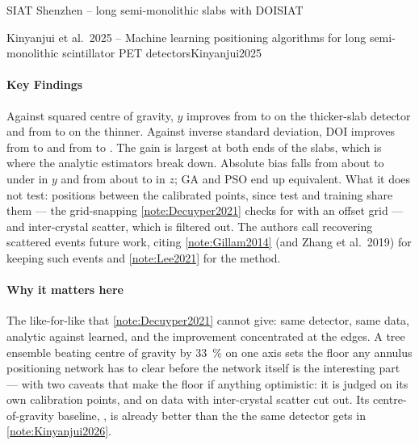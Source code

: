 \begin{programnote}{SIAT Shenzhen -- long semi-monolithic slabs with DOI}{SIAT}
\begin{papernote}{Kinyanjui et al.\ 2025 -- Machine learning positioning algorithms for long semi-monolithic scintillator PET detectors}{Kinyanjui2025}
\paragraph{Key Findings}
Against squared centre of gravity, $y$ improves from  to
 on the thicker-slab detector and from  to
 on the thinner. Against inverse standard deviation, DOI
improves from  to  and from
 to . The gain is largest at both ends of
the slabs, which is where the analytic estimators break down.
Absolute bias falls from about  to under  in $y$ and from
about  to  in $z$; GA and PSO end up equivalent.
What it does not test: positions between the calibrated points, since test
and training share them --- the grid-snapping \ref{note:Decuyper2021} checks for
with an offset grid --- and inter-crystal scatter, which is filtered out.
The authors call recovering scattered events future work, citing
\ref{note:Gillam2014} (and Zhang et al.\ 2019) for keeping such events and
\ref{note:Lee2021} for the method.

\paragraph{Why it matters here}
The like-for-like that \ref{note:Decuyper2021} cannot give: same detector, same
data, analytic against learned, and the improvement concentrated at the edges.
A tree ensemble beating centre of gravity by \qty{33}{\percent} on one axis
sets the floor any annulus positioning network has to clear before the network
itself is the interesting part --- with two caveats that make the floor if
anything optimistic: it is judged on its own calibration points, and on data
with inter-crystal scatter cut out. Its centre-of-gravity baseline, ,
is already better than the  the same detector gets in
\ref{note:Kinyanjui2026}.


\end{papernote}
\end{programnote}
